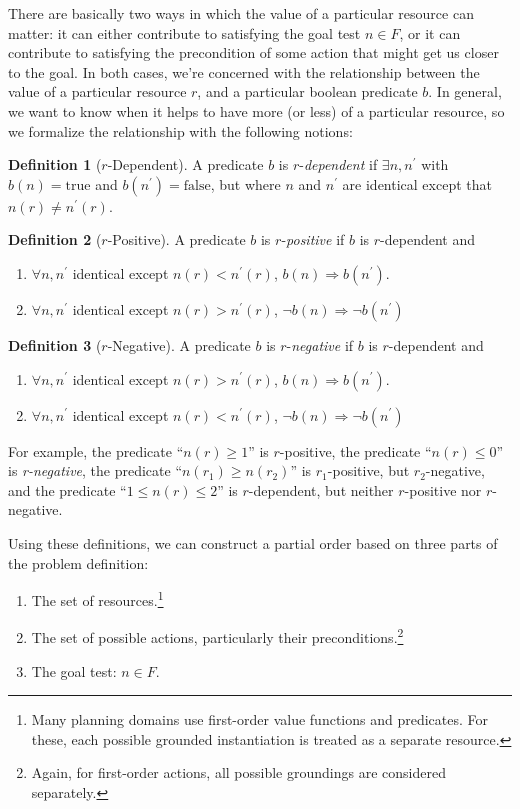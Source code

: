 \documentclass[letterpaper]{article}
\theoremstyle{plain} \newtheorem{theorem}{Theorem} \newtheorem{proposition}{Proposition} \newtheorem{lemma}{Lemma}
\theoremstyle{definition} \newtheorem{definition}{Definition} \newtheorem{conjecture}{Conjecture} \newtheorem*{example}{Example}
\theoremstyle{remark} \newtheorem*{remark}{Remark} \newtheorem*{note}{Note} \newtheorem{case}{Case}
\begin{document}
There are basically two ways in which the value of a particular resource can matter: it can
either contribute to satisfying the goal test $n \in F$, or it can contribute to satisfying
the precondition of some action that might get us closer to the goal. In both cases, we're
concerned with the relationship between the value of a particular resource $r$, and a
particular boolean predicate $b$. In general, we want to know when it helps to have more (or less) of a particular resource, so we formalize the relationship with the following notions:
\begin{definition}[$r$-Dependent]
A predicate $b$ is $r$-\textit{dependent} if $\exists n, n^\prime$ with $b(n) = \text{true}$ and $b(n^\prime) = \text{false}$, but where $n$ and $n^\prime$ are identical except that $n(r) \ne n^\prime(r)$.
\end{definition}
\begin{definition}[$r$-Positive]
	A predicate $b$ is $r$-\textit{positive} if $b$ is $r$-dependent and
	\begin{enumerate}
		\item $\forall n, n^\prime$ identical except $n(r) < n^\prime(r)$, $b(n) \Rightarrow b(n^\prime).$
		\item $\forall n, n^\prime$ identical except $n(r) > n^\prime(r)$, $\neg b(n) \Rightarrow \neg b(n^\prime)$
	\end{enumerate}
\end{definition}
\begin{definition}[$r$-Negative]
	A predicate $b$ is $r$-\textit{negative} if $b$ is $r$-dependent and
	\begin{enumerate}
		\item $\forall n, n^\prime$ identical except $n(r) > n^\prime(r)$, $b(n) \Rightarrow b(n^\prime).$
		\item $\forall n, n^\prime$ identical except $n(r) < n^\prime(r)$, $\neg b(n) \Rightarrow \neg b(n^\prime)$
	\end{enumerate}
\end{definition}
For example, the predicate ``$n(r) \ge 1$'' is $r$-positive, the predicate ``$n(r) \le 0$'' is \textit{r-negative}, the predicate ``$n(r_1) \ge n(r_2)$'' is $r_1$-positive, but $r_2$-negative, and the predicate ``$1 \le n(r) \le 2$'' is $r$-dependent, but neither $r$-positive nor $r$-negative.

Using these definitions, we can construct a partial order based on three parts of the problem definition:
\begin{enumerate}
	\item The set of resources.\footnote{Many planning domains use first-order value functions and predicates. For these, each possible grounded instantiation is treated as a separate resource.}
	\item The set of possible actions, particularly their preconditions.\footnote{Again, for first-order actions, all possible groundings are considered separately.}
	\item The goal test: $n \in F$.
\end{enumerate}
\end{document}
